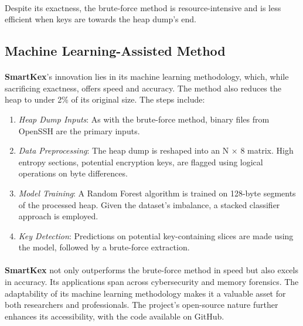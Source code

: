     \paragraph{}Despite its exactness, the brute-force method is resource-intensive and is less efficient when keys are towards the heap dump's end.

    \subsection{Machine Learning-Assisted Method}

    \paragraph{}\textbf{SmartKex}'s innovation lies in its machine learning methodology, which, while sacrificing exactness, offers speed and accuracy. The method also reduces the heap to under 2\% of its original size. The steps include:
    \begin{enumerate}
        \item \textit{Heap Dump Inputs}: As with the brute-force method, binary files from OpenSSH are the primary inputs.
        \item \textit{Data Preprocessing}: The heap dump is reshaped into an N × 8 matrix. High entropy sections, potential encryption keys, are flagged using logical operations on byte differences.
        \item \textit{Model Training}: A Random Forest algorithm is trained on 128-byte segments of the processed heap. Given the dataset's imbalance, a stacked classifier approach is employed.
        \item \textit{Key Detection}: Predictions on potential key-containing slices are made using the model, followed by a brute-force extraction.
    \end{enumerate}
    \paragraph{}\textbf{SmartKex} not only outperforms the brute-force method in speed but also excels in accuracy. Its applications span across cybersecurity and memory forensics. The adaptability of its machine learning methodology makes it a valuable asset for both researchers and professionals. The project's open-source nature further enhances its accessibility, with the code available on GitHub.